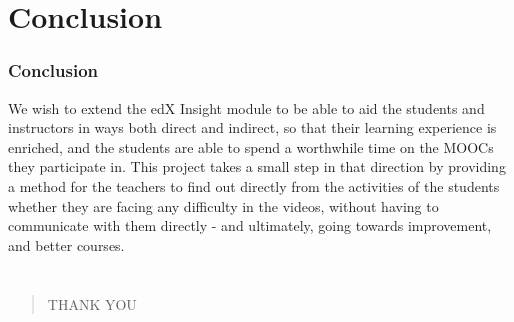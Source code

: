 \documentclass[12pt,xcolor=dvipsnames]{beamer}
\begin{document}

\section{Conclusion}
\begin{frame}[t]
\frametitle{Conclusion}


We wish to extend the edX Insight module to be able to aid the students and instructors in ways both direct and indirect, so that their learning experience is enriched, and the students are able to spend a worthwhile time on the MOOCs they participate in. This project takes a small step in that direction by providing a method for the teachers to find out directly from the activities of the students whether they are facing any difficulty in the videos, without having to communicate with them directly - and ultimately, going towards improvement, and better courses. 

\end{frame}




\section{}
\frametitle{}
\begin{frame}[t]

\vfill

\begin{verse}
\centering
\begin{Huge}THANK YOU\end{Huge}
\end{verse}


\end{frame}

\end{document}
